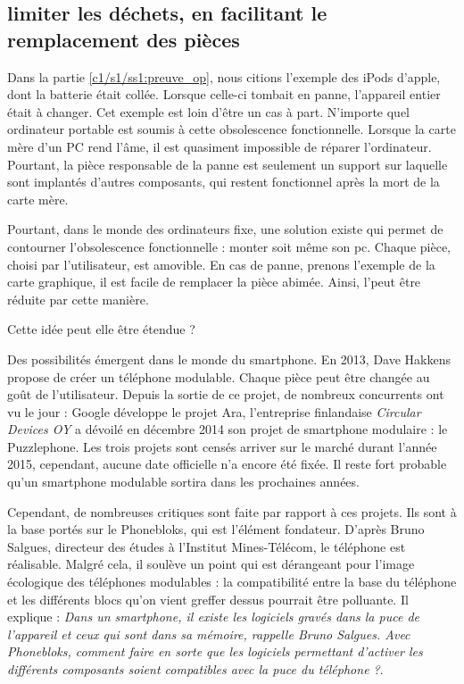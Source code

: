 \subsection{limiter les déchets, en facilitant le remplacement des pièces }

Dans la partie \ref{c1/s1/ss1:preuve_op}, nous citions l'exemple des iPods d'apple, dont la batterie était collée. Lorsque celle-ci tombait en panne,  l'appareil entier était à changer. 
Cet exemple est loin d'être un cas à part. N'importe quel ordinateur portable est soumis à cette obsolescence fonctionnelle. Lorsque la carte mère d'un PC rend l'âme, il est quasiment impossible de réparer l'ordinateur. Pourtant, la pièce responsable de la panne est seulement un support sur laquelle sont implantés d'autres composants, qui restent fonctionnel après la mort de la carte mère.  

Pourtant, dans le monde des ordinateurs fixe, une solution existe qui permet de contourner l'obsolescence fonctionnelle : monter soit même son pc. Chaque pièce, choisi par l'utilisateur, est amovible. En cas de panne, prenons l'exemple de la carte graphique, il est facile de remplacer la pièce abimée. Ainsi, l'\op peut être réduite par cette manière. 


Cette idée peut elle être étendue ? 

\bigbreak

Des possibilités émergent dans le monde du smartphone. En 2013, Dave Hakkens propose de créer un téléphone modulable. Chaque pièce peut être changée au goût de l'utilisateur. Depuis la sortie de ce projet, de nombreux concurrents ont vu le jour : Google développe le projet Ara,  l'entreprise finlandaise \textit{Circular Devices OY} a dévoilé en décembre 2014 son projet de smartphone modulaire : le Puzzlephone. Les trois projets sont censés arriver sur le marché durant l'année 2015, cependant, aucune date officielle n'a encore été fixée. Il reste fort probable qu'un smartphone modulable sortira dans les prochaines années. 

Cependant, de nombreuses critiques sont faite par rapport à ces projets. Ils sont à la base portés sur le Phonebloks, qui est l'élément fondateur. D'après  Bruno Salgues\cite{phonebloks_critiques}, directeur des études à l'Institut Mines-Télécom, le téléphone est réalisable. Malgré cela, il soulève un point  qui est dérangeant pour l'image écologique des téléphones modulables : la compatibilité entre la base du téléphone et les différents blocs qu'on vient greffer dessus pourrait être polluante. Il explique : \og{}\textit{Dans un smartphone, il existe les logiciels gravés dans la puce de l’appareil et ceux qui sont dans sa mémoire, rappelle Bruno Salgues. Avec Phonebloks, comment faire en sorte que les logiciels permettant d'activer les différents composants soient compatibles avec la puce du téléphone ?}\fg{}. 

